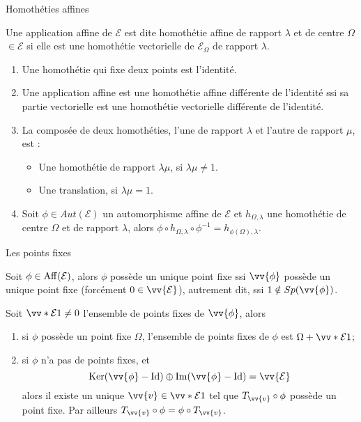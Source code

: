 \documentclass[
bigger]{m53beamer}
\begin{document}
  \begin{frame}{Homothéties affines}
    \begin{definition}
      Une application affine de $\mathcal{E}$ est dite \alert{homothétie affine de rapport $\lambda$ et de centre $\Omega$}$\in\mathcal{E}$ si elle est une homothétie vectorielle de $\mathcal{E}_{\Omega}$ de rapport $\lambda$.
    \end{definition}
    \begin{enumerate}[<+(1)->]
      \item Une homothétie qui fixe deux points est l'identité.
      \item Une application affine est une homothétie affine différente de l'identité ssi sa partie vectorielle est une homothétie vectorielle différente de l'identité.
      \item La composée de deux homothéties, l'une de rapport $\lambda$ et l'autre de rapport $\mu$, est :
      \begin{itemize}[<+(1)->]
        \item Une homothétie de rapport $\lambda\mu$, si $\lambda\mu \neq 1$.
        \item Une translation, si $\lambda\mu=1$.
      \end{itemize}
      \item Soit $\phi \in Aut(\mathcal{E})$ un automorphisme affine de $\mathcal{E}$ et $h_{\Omega,\lambda}$ une homothétie de centre $\Omega$ et de rapport $\lambda$, alors $\phi\circ h_{\Omega,\lambda}\circ\phi^{-1}=h_{\phi(\Omega),\lambda}$.
    \end{enumerate}
  \end{frame}
  \begin{frame}{Les points fixes}
    \begin{proposition}
      Soit $\phi\in\operatorname{Aff}(\mathcal{E})$, alors $\phi$ possède un unique point fixe ssi $\vv{\phi}$ possède un unique point fixe (forcément $0\in\vv{\mathcal{E}}$)\pause, autrement dit, ssi $1 \notin Sp(\vv{\phi})$.
    \end{proposition}\pause
    \begin{proposition}
      Soit $\vv*{\mathcal{E}}{1} \neq 0$ l'ensemble de points fixes de $\vv{\phi}$, alors
      \begin{enumerate}[<+(1)->]
        \item si $\phi$ possède un point fixe $\Omega$, l'ensemble de points fixes de $\phi$ est $\Omega+\vv*{\mathcal{E}}{1}$;
        \item si $\phi$ n'a pas de points fixes\pause, et
          $$
            \ker(\vv{\phi}-\id) \oplus \im(\vv{\phi}-\id) = \vv{\mathcal{E}}
          $$\pause
        alors il existe un unique $\vv{v}\in\vv*{\mathcal{E}}{1}$ tel que $T_{\vv{v}}\circ\phi$ possède un point fixe.\newline\pause
        Par ailleurs $T_{\vv{v}}\circ\phi=\phi\circ T_{\vv{v}}$.
      \end{enumerate}
    \end{proposition}
  \end{frame}
\end{document}
